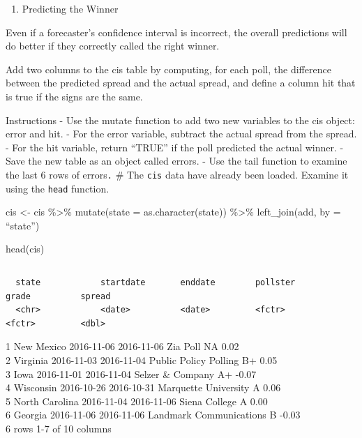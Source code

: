 \documentclass[
]{article}
\providecommand{\tightlist}{%
  \setlength{\itemsep}{0pt}\setlength{\parskip}{0pt}}
\begin{document}
\begin{enumerate}
\def\labelenumi{\arabic{enumi}.}
\setcounter{enumi}{5}
\tightlist
\item
  Predicting the Winner
\end{enumerate}

Even if a forecaster's confidence interval is incorrect, the overall
predictions will do better if they correctly called the right winner.

Add two columns to the cis table by computing, for each poll, the
difference between the predicted spread and the actual spread, and
define a column hit that is true if the signs are the same.

Instructions - Use the mutate function to add two new variables to the
cis object: error and hit. - For the error variable, subtract the actual
spread from the spread. - For the hit variable, return ``TRUE'' if the
poll predicted the actual winner. - Save the new table as an object
called errors. - Use the tail function to examine the last 6 rows of
errors\texttt{.} \# The \texttt{cis} data have already been loaded.
Examine it using the \texttt{head} function.

cis \textless- cis \%\textgreater\% mutate(state = as.character(state))
\%\textgreater\% left\_join(add, by = ``state'')

head(cis)

\begin{verbatim}
\end{verbatim}

\begin{verbatim}
  state            startdate       enddate        pollster                 grade          spread
  <chr>            <date>          <date>         <fctr>                   <fctr>         <dbl>
\end{verbatim}

1 New Mexico 2016-11-06 2016-11-06 Zia Poll NA 0.02\\
2 Virginia 2016-11-03 2016-11-04 Public Policy Polling B+ 0.05\\
3 Iowa 2016-11-01 2016-11-04 Selzer \& Company A+ -0.07\\
4 Wisconsin 2016-10-26 2016-10-31 Marquette University A 0.06\\
5 North Carolina 2016-11-04 2016-11-06 Siena College A 0.00\\
6 Georgia 2016-11-06 2016-11-06 Landmark Communications B -0.03\\
6 rows \textbar{} 1-7 of 10 columns
\end{document}
